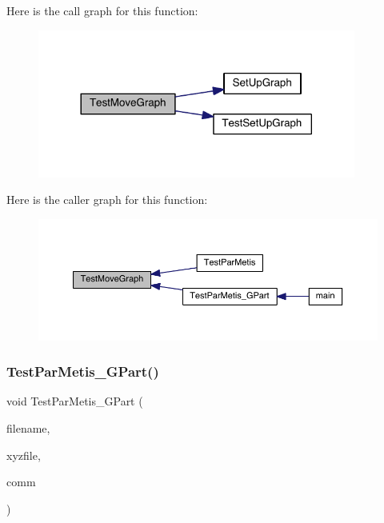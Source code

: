 Here is the call graph for this function\+:\nopagebreak
\begin{figure}[H]
\begin{center}
\leavevmode
\includegraphics[width=296pt]{a00954_a646249107ea9150124408b418ad61f15_cgraph}
\end{center}
\end{figure}
Here is the caller graph for this function\+:\nopagebreak
\begin{figure}[H]
\begin{center}
\leavevmode
\includegraphics[width=350pt]{a00954_a646249107ea9150124408b418ad61f15_icgraph}
\end{center}
\end{figure}
\mbox{\label{a00954_adb0c2dc0c5138f35c71739328c702074}} 
\subsubsection{\texorpdfstring{Test\+Par\+Metis\+\_\+\+G\+Part()}{TestParMetis\_GPart()}}
{\footnotesize\ttfamily void Test\+Par\+Metis\+\_\+\+G\+Part (\begin{DoxyParamCaption}\item[{char $\ast$}]{filename,  }\item[{char $\ast$}]{xyzfile,  }\item[{M\+P\+I\+\_\+\+Comm}]{comm }\end{DoxyParamCaption})}

